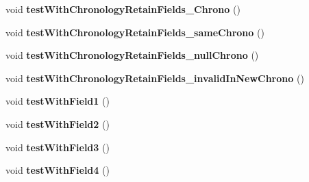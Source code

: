 \begin{DoxyCompactItemize}
\item 
\hypertarget{classorg_1_1joda_1_1time_1_1_test_year_month_day___basics_a071f8c138051ba1c3e551886f16bcdb9}{void {\bfseries test\-With\-Chronology\-Retain\-Fields\-\_\-\-Chrono} ()}\label{classorg_1_1joda_1_1time_1_1_test_year_month_day___basics_a071f8c138051ba1c3e551886f16bcdb9}

\item 
\hypertarget{classorg_1_1joda_1_1time_1_1_test_year_month_day___basics_a225b994a4703a936f417610f0b1a5291}{void {\bfseries test\-With\-Chronology\-Retain\-Fields\-\_\-same\-Chrono} ()}\label{classorg_1_1joda_1_1time_1_1_test_year_month_day___basics_a225b994a4703a936f417610f0b1a5291}

\item 
\hypertarget{classorg_1_1joda_1_1time_1_1_test_year_month_day___basics_a8b6a6d3f15c4304b66329aeffe8b7e2a}{void {\bfseries test\-With\-Chronology\-Retain\-Fields\-\_\-null\-Chrono} ()}\label{classorg_1_1joda_1_1time_1_1_test_year_month_day___basics_a8b6a6d3f15c4304b66329aeffe8b7e2a}

\item 
\hypertarget{classorg_1_1joda_1_1time_1_1_test_year_month_day___basics_a5400478c18fb99bab0b7e3f7e740ce49}{void {\bfseries test\-With\-Chronology\-Retain\-Fields\-\_\-invalid\-In\-New\-Chrono} ()}\label{classorg_1_1joda_1_1time_1_1_test_year_month_day___basics_a5400478c18fb99bab0b7e3f7e740ce49}

\item 
\hypertarget{classorg_1_1joda_1_1time_1_1_test_year_month_day___basics_aefe40cb855ddc298483dce50fa40dc4e}{void {\bfseries test\-With\-Field1} ()}\label{classorg_1_1joda_1_1time_1_1_test_year_month_day___basics_aefe40cb855ddc298483dce50fa40dc4e}

\item 
\hypertarget{classorg_1_1joda_1_1time_1_1_test_year_month_day___basics_ac0462bfd1a2d2165fb575bc224b8c529}{void {\bfseries test\-With\-Field2} ()}\label{classorg_1_1joda_1_1time_1_1_test_year_month_day___basics_ac0462bfd1a2d2165fb575bc224b8c529}

\item 
\hypertarget{classorg_1_1joda_1_1time_1_1_test_year_month_day___basics_a5b3a6ed0e5d032636de29a1a95852191}{void {\bfseries test\-With\-Field3} ()}\label{classorg_1_1joda_1_1time_1_1_test_year_month_day___basics_a5b3a6ed0e5d032636de29a1a95852191}

\item 
\hypertarget{classorg_1_1joda_1_1time_1_1_test_year_month_day___basics_a231040763811cf999dbb87732f498487}{void {\bfseries test\-With\-Field4} ()}\label{classorg_1_1joda_1_1time_1_1_test_year_month_day___basics_a231040763811cf999dbb87732f498487}


\end{DoxyCompactItemize}
